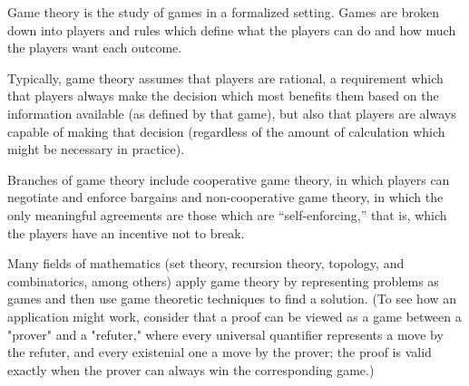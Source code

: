 \documentclass[12pt]{article}
\begin{document}
Game theory is the study of games in a formalized setting.  Games are broken down into players and rules which define what the players can do and how much the players want each outcome.

Typically, game theory assumes that players are rational, a requirement which that players always make the decision which most benefits them based on the information available (as defined by that game), but also that players are always capable of making that decision (regardless of the amount of calculation which might be necessary in practice).

Branches of game theory include cooperative game theory, in which players can negotiate and enforce bargains and non-cooperative game theory, in which the only meaningful agreements are those which are ``self-enforcing,'' that is, which the players have an incentive not to break.

Many fields of mathematics (set theory, recursion theory, topology, and combinatorics, among others) apply game theory by representing problems as games and then use game theoretic techniques to find a solution.  (To see how an application might work, consider that a proof can be viewed as a game between a "prover" and a "refuter," where every universal quantifier represents a move by the refuter, and every existenial one a move by the prover; the proof is valid exactly when the prover can always win the corresponding game.)
\end{document}
